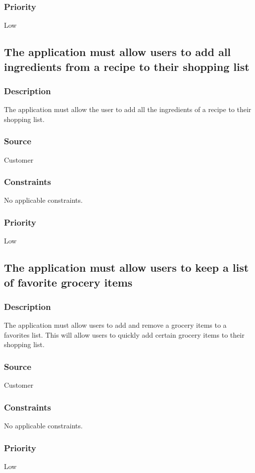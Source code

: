 \subsubsection{Priority}
Low\\

\subsection{The application must allow users to add all ingredients from a recipe to their shopping list}
\subsubsection{Description}
The application must allow the user to add all the ingredients of a recipe to their shopping list.
\subsubsection{Source}
Customer
\subsubsection{Constraints}
No applicable constraints.
\subsubsection{Priority}
Low\\

\subsection{The application must allow users to keep a list of favorite grocery items}
\subsubsection{Description}
The application must allow users to add and remove a grocery items to a favorites list. This will allow users to quickly add certain grocery items to their shopping list.
\subsubsection{Source}
Customer
\subsubsection{Constraints}
No applicable constraints.
\subsubsection{Priority}
Low
